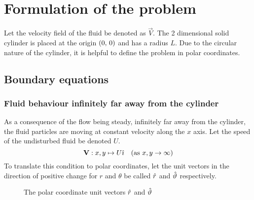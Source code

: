 \section{Formulation of the problem}
Let the velocity field of the fluid be denoted as $\vec{V}$. The 2 dimensional solid cylinder is placed at the origin $\left(0,\,0\right)$ and has a radius $L$. Due to the circular nature of the cylinder,
it is helpful to define the problem in polar coordinates.

\subsection{Boundary equations}\label{section:BOUNDARY}
\subsubsection{Fluid behaviour infinitely far away from the cylinder}
As a consequence of the flow being steady, infinitely far away from the cylinder, the fluid particles are moving at constant velocity along the $x$ axis. Let the speed of the undisturbed fluid
be denoted $U$.
$$
    \mathbf{V}:x,y\mapsto U\hat{\imath}\quad(\text{as $x,y\rightarrow\infty$})
$$
To translate this condition to polar coordinates, let the unit vectors in the direction of positive change for $r$ and $\theta$ be called $\hat{r}$ and $\hat{\vartheta}$ respectively.
\begin{figure}[!ht]
    \begin{center}        
    \end{center}
    \caption{The polar coordinate unit vectors $\hat{r}$ and $\hat{\vartheta}$}
    \label{figure:POLAR}
\end{figure}
